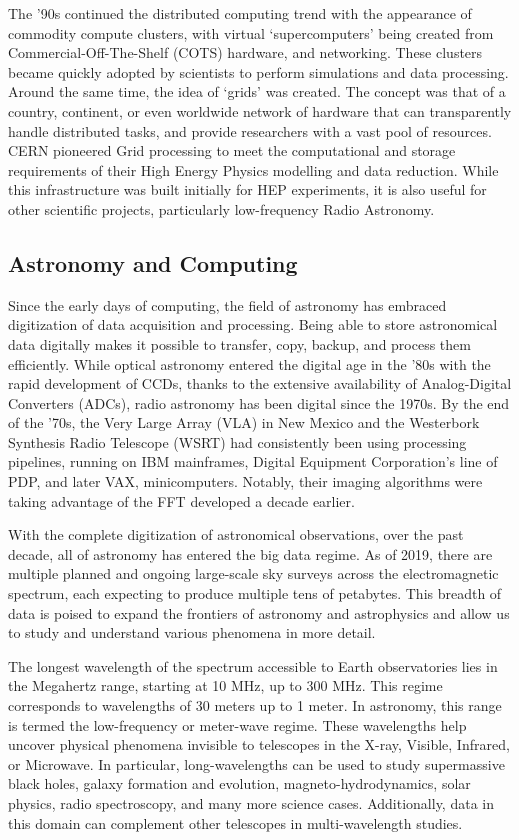 The '90s continued the distributed computing trend with the appearance of commodity compute clusters, with virtual `supercomputers' being created from Commercial-Off-The-Shelf (COTS) hardware, and networking. These clusters became quickly adopted by scientists to perform simulations and data processing. Around the same time, the idea of `grids' was created\citep{cheng1989software}. The concept was that of a country, continent, or even worldwide network of hardware that can transparently handle distributed tasks, and provide researchers with a vast pool of resources. CERN pioneered \Gls{Grid} processing to meet the computational and storage requirements of their High Energy Physics modelling and data reduction. While this infrastructure was built initially for HEP experiments, it is also useful for other scientific projects, particularly low-frequency Radio Astronomy. 


\subsection{Astronomy and Computing}

Since the early days of computing, the field of astronomy has embraced digitization of data acquisition and processing. Being able to store astronomical data digitally makes it possible to transfer, copy, backup, and process them efficiently. While optical astronomy entered the digital age in the '80s with the rapid development of CCDs, thanks to the extensive availability of Analog-Digital Converters (ADCs), radio astronomy has been digital since the 1970s. By the end of the '70s, the Very Large Array (VLA) in New Mexico and the Westerbork Synthesis Radio Telescope (WSRT) had consistently been using processing pipelines, running on IBM mainframes, Digital Equipment Corporation's line of PDP, and later VAX, minicomputers. Notably, their imaging algorithms were taking advantage of the FFT developed a decade earlier\citep{clark1980_clean}.

With the complete digitization of astronomical observations, over the past decade, all of astronomy has entered the big data regime. As of 2019, there are multiple planned and ongoing large-scale sky surveys across the electromagnetic spectrum, each expecting to produce multiple tens of petabytes. This breadth of data is poised to expand the frontiers of astronomy and astrophysics and allow us to study and understand various phenomena in more detail.

The longest wavelength of the spectrum accessible to Earth observatories lies in the Megahertz range, starting at 10 MHz, up to 300 MHz. This regime corresponds to wavelengths of 30 meters up to 1 meter. In astronomy, this range is termed the low-frequency or meter-wave regime. These wavelengths help uncover physical phenomena invisible to telescopes in the X-ray, Visible, Infrared, or Microwave. In particular, long-wavelengths can be used to study supermassive black holes, galaxy formation and evolution, magneto-hydrodynamics, solar physics, radio spectroscopy, and many more science cases. Additionally, data in this domain can complement other telescopes in multi-wavelength studies.

